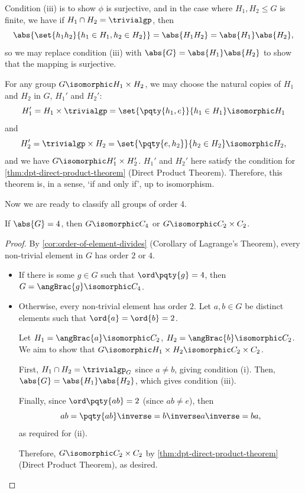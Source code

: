 \begin{remark}
    Condition (iii) is to show \(\phi\) is surjective, and in the case where \(H_1, H_2 \leq G\) is finite, we have if \(H_1 \cap H_2 = \trivialgp\), then
    \[
        \abs{\set{h_1 h_2}{h_1 \in H_1, h_2 \in H_2}} = \abs{H_1 H_2} = \abs{H_1} \abs{H_2},
    \]
    so we may replace condition (iii) with \(\abs{G} = \abs{H_1} \abs{H_2}\) to show that the mapping is surjective.
\end{remark}

\begin{remark}
    For any group \(G \isomorphic H_1 \times H_2\), we may choose the natural copies of \(H_1\) and \(H_2\) in \(G\), \(H_1'\) and \(H_2'\):
    \[
        H_1' = H_1 \times \trivialgp = \set{\pqty{h_1, e}}{h_1 \in H_1} \isomorphic H_1
    \]
    and
    \[
        H_2' = \trivialgp \times H_2 = \set{\pqty{e, h_2}}{h_2 \in H_2} \isomorphic H_2,
    \]
    and we have \(G \isomorphic H_1' \times H_2'\). \(H_1'\) and \(H_2'\) here satisfy the condition for \autoref{thm:dpt-direct-product-theorem} (Direct Product Theorem). Therefore, this theorem is, in a sense, `if and only if', up to isomorphism.
\end{remark}

Now we are ready to classify all groups of order 4.

\begin{lemma}
    \label{lem:groups-of-order-4}%
    If \(\abs{G} = 4\), then \(G \isomorphic C_4\) or \(G \isomorphic C_2 \times C_2\).
\end{lemma}

\begin{proof}
    By \autoref{cor:order-of-element-divides} (Corollary of Lagrange's Theorem), every non-trivial element in \(G\) has order \(2\) or \(4\).
    
    \begin{itemize}
        \item If there is some \(g \in G\) such that \(\ord\pqty{g} = 4\), then \(G = \angBrac{g} \isomorphic C_4\).
        \item Otherwise, every non-trivial element has order \(2\). Let \(a, b \in G\) be distinct elements such that \(\ord{a} = \ord{b} = 2\).
        
        Let \(H_1 = \angBrac{a} \isomorphic C_2\), \(H_2 = \angBrac{b} \isomorphic C_2\). We aim to show that \(G \isomorphic H_1 \times H_2 \isomorphic C_2 \times C_2\).

        First, \(H_1 \cap H_2 = \trivialgp_{G}\) since \(a \neq b\), giving condition (i). Then, \(\abs{G} = \abs{H_1} \abs{H_2}\), which gives condition (iii).

        Finally, since \(\ord\pqty{ab} = 2\) (since \(ab \neq e\)), then
        \[
            ab = \pqty{ab}\inverse = b\inverse a\inverse = ba,
        \]
        as required for (ii).

        Therefore, \(G \isomorphic C_2 \times C_2\) by \autoref{thm:dpt-direct-product-theorem} (Direct Product Theorem), as desired.
    \end{itemize}
\end{proof}

